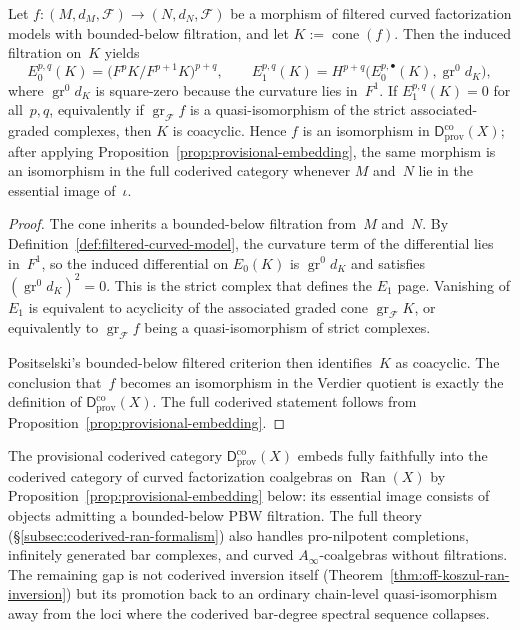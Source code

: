 \begin{proposition}
\label{prop:coderived-bar-degree-spectral-sequence}
Let
$f \colon (M, d_M, \mathcal{F}) \to (N, d_N, \mathcal{F})$
be a morphism of filtered curved factorization models with
bounded-below filtration, and let
$K := \operatorname{cone}(f)$.
Then the induced filtration on~$K$ yields
\[
E_0^{p,q}(K)
=
\bigl(F^p K/F^{p+1}K\bigr)^{p+q},
\qquad
E_1^{p,q}(K)
=
H^{p+q}\bigl(E_0^{p,\bullet}(K), \operatorname{gr}^0 d_K\bigr),
\]
where $\operatorname{gr}^0 d_K$ is square-zero because the curvature
lies in~$F^1$. If $E_1^{p,q}(K)=0$ for all~$p,q$, equivalently if
$\operatorname{gr}_{\mathcal{F}} f$ is a quasi-isomorphism of the
strict associated-graded complexes, then $K$ is coacyclic. Hence $f$
is an isomorphism in
$\mathsf{D}^{\mathrm{co}}_{\mathrm{prov}}(X)$; after applying
Proposition~\ref{prop:provisional-embedding}, the same morphism is an
isomorphism in the full coderived category whenever $M$ and~$N$ lie
in the essential image of~$\iota$.
\end{proposition}

\begin{proof}
The cone inherits a bounded-below filtration from~$M$ and~$N$.
By Definition~\ref{def:filtered-curved-model}, the curvature term of
the differential lies in~$F^1$, so the induced differential on
$E_0(K)$ is $\operatorname{gr}^0 d_K$ and satisfies
$(\operatorname{gr}^0 d_K)^2 = 0$. This is the strict complex that
defines the $E_1$ page. Vanishing of $E_1$ is equivalent to
acyclicity of the associated graded cone
$\operatorname{gr}_{\mathcal{F}} K$, or equivalently to
$\operatorname{gr}_{\mathcal{F}} f$ being a quasi-isomorphism of
strict complexes.

Positselski's bounded-below filtered criterion
\cite[Proposition~3.5]{Positselski11} then identifies~$K$ as
coacyclic. The conclusion that~$f$ becomes an isomorphism in the
Verdier quotient is exactly the definition of
$\mathsf{D}^{\mathrm{co}}_{\mathrm{prov}}(X)$. The full coderived
statement follows from Proposition~\ref{prop:provisional-embedding}.
\end{proof}

\begin{remark}
\label{rem:coderived-full}
The provisional coderived category
$\mathsf{D}^{\mathrm{co}}_{\mathrm{prov}}(X)$ embeds fully faithfully
into the coderived category of curved factorization coalgebras on
$\operatorname{Ran}(X)$ by
Proposition~\ref{prop:provisional-embedding} below: its essential
image consists of objects admitting a bounded-below PBW filtration.
The full theory (\S\ref{subsec:coderived-ran-formalism}) also
handles pro-nilpotent completions, infinitely generated bar complexes,
and curved $A_\infty$-coalgebras without filtrations. The remaining
gap is not coderived inversion itself
\textup{(}Theorem~\ref{thm:off-koszul-ran-inversion}\textup{)}
but its promotion back to an ordinary chain-level
quasi-isomorphism away from the loci where the coderived
bar-degree spectral sequence collapses.
\end{remark}

